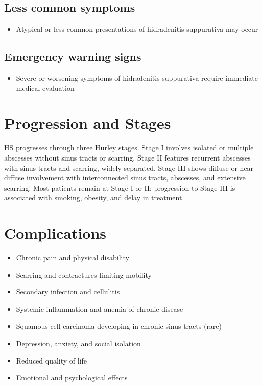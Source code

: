 \subsection{Less common symptoms}
\begin{itemize}[noitemsep]
  \item Atypical or less common presentations of hidradenitis suppurativa may occur
\end{itemize}

\subsection{Emergency warning signs}
\begin{itemize}[noitemsep]
  \item Severe or worsening symptoms of hidradenitis suppurativa require immediate medical evaluation
\end{itemize}
\section{Progression and Stages}
HS progresses through three Hurley stages. Stage I involves isolated or multiple abscesses without sinus tracts or scarring. Stage II features recurrent abscesses with sinus tracts and scarring, widely separated. Stage III shows diffuse or near-diffuse involvement with interconnected sinus tracts, abscesses, and extensive scarring. Most patients remain at Stage I or II; progression to Stage III is associated with smoking, obesity, and delay in treatment.

\section{Complications}

\begin{itemize}[noitemsep]
  \item Chronic pain and physical disability
  \item Scarring and contractures limiting mobility
  \item Secondary infection and cellulitis
  \item Systemic inflammation and anemia of chronic disease
  \item Squamous cell carcinoma developing in chronic sinus tracts (rare)
  \item Depression, anxiety, and social isolation
  \item Reduced quality of life
  \item Emotional and psychological effects
\end{itemize}

